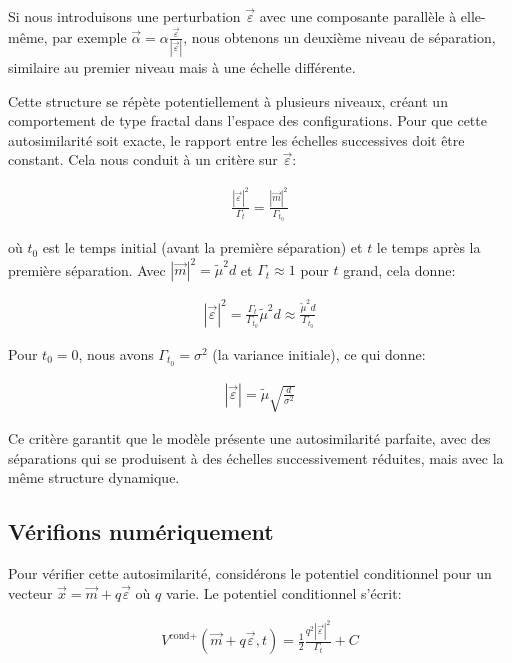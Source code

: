 \documentclass[11pt,a4paper]{article}
\begin{document}
Si nous introduisons une perturbation $\vec{\varepsilon}$ avec une composante parallèle à elle-même, par exemple $\vec{\alpha} = \alpha \frac{\vec{\varepsilon}}{|\vec{\varepsilon}|}$, nous obtenons un deuxième niveau de séparation, similaire au premier niveau mais à une échelle différente.

Cette structure se répète potentiellement à plusieurs niveaux, créant un comportement de type fractal dans l'espace des configurations. Pour que cette autosimilarité soit exacte, le rapport entre les échelles successives doit être constant. Cela nous conduit à un critère sur $\vec{\varepsilon}$:

\begin{align}
\frac{|\vec{\varepsilon}|^2}{\Gamma_t} = \frac{|\vec{m}|^2}{\Gamma_{t_0}}
\end{align}

où $t_0$ est le temps initial (avant la première séparation) et $t$ le temps après la première séparation. Avec $|\vec{m}|^2 = \tilde{\mu}^2 d$ et $\Gamma_t \approx 1$ pour $t$ grand, cela donne:

\begin{align}
|\vec{\varepsilon}|^2 = \frac{\Gamma_t}{\Gamma_{t_0}} \tilde{\mu}^2 d \approx \frac{\tilde{\mu}^2 d}{\Gamma_{t_0}}
\end{align}

Pour $t_0 = 0$, nous avons $\Gamma_{t_0} = \sigma^2$ (la variance initiale), ce qui donne:

\begin{align}
|\vec{\varepsilon}| = \tilde{\mu}\sqrt{\frac{d}{\sigma^2}}
\end{align}

Ce critère garantit que le modèle présente une autosimilarité parfaite, avec des séparations qui se produisent à des échelles successivement réduites, mais avec la même structure dynamique.

\subsection{Vérifions numériquement}

Pour vérifier cette autosimilarité, considérons le potentiel conditionnel pour un vecteur $\vec{x} = \vec{m} + q\vec{\varepsilon}$ où $q$ varie. Le potentiel conditionnel s'écrit:

\begin{align}
V^{\text{cond}+}(\vec{m} + q\vec{\varepsilon}, t) = \frac{1}{2}\frac{q^2|\vec{\varepsilon}|^2}{\Gamma_t} + C
\end{align}
\end{document}
